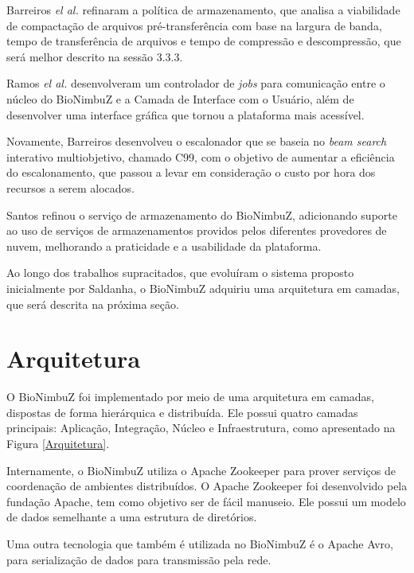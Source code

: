 Barreiros \textit{el al.}\cite{BioNimbuZ_BioCirrus} refinaram a política de armazenamento, que analisa a viabilidade de compactação de arquivos pré-transferência com base na largura de banda, tempo de transferência de arquivos e tempo de compressão e descompressão, que será melhor descrito na sessão 3.3.3.

Ramos \textit{el al.}\cite{BioNimbuZ_Ramos} desenvolveram um controlador de \textit{jobs} para comunicação entre o núcleo do BioNimbuZ e a Camada de Interface com o Usuário, além de desenvolver uma interface gráfica que tornou a plataforma mais acessível.

Novamente, Barreiros\cite{BioNimbuZ_Willian_C99} desenvolveu o escalonador que se baseia no \textit{beam search} interativo multiobjetivo, chamado C99, com o objetivo de aumentar a eficiência do escalonamento, que passou a levar em consideração o custo por hora dos recursos a serem alocados.

Santos\cite{BioNimbuZ_Santos} refinou o serviço de armazenamento do BioNimbuZ, adicionando suporte ao uso de serviços de armazenamentos providos pelos diferentes provedores de nuvem, melhorando a praticidade e a usabilidade da plataforma.

Ao longo dos trabalhos supracitados, que evoluíram o sistema proposto inicialmente por Saldanha\cite{Saldanha_BioNimbus}, o BioNimbuZ adquiriu uma arquitetura em camadas, que será descrita na próxima seção.

\section{Arquitetura}
O BioNimbuZ foi implementado por meio de uma arquitetura em camadas, dispostas de forma hierárquica e distribuída. Ele possui quatro camadas principais: Aplicação, Integração, Núcleo e Infraestrutura, como apresentado na Figura \ref{Arquitetura}.

Internamente, o BioNimbuZ utiliza o Apache Zookeeper\cite{Zookeeper} para prover serviços de coordenação de ambientes distribuídos. O Apache Zookeeper foi desenvolvido pela fundação Apache\cite{Apache}, tem como objetivo ser de fácil manuseio. Ele possui um modelo de dados semelhante a uma estrutura de diretórios.

Uma outra tecnologia que também é utilizada no BioNimbuZ é o Apache Avro\cite{Avro}, para serialização de dados para transmissão pela rede.


